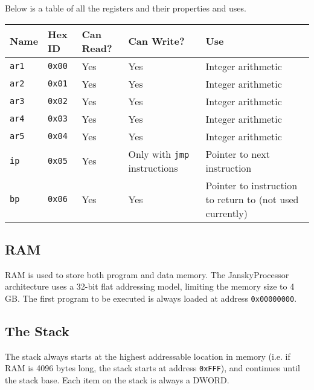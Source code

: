 \documentclass[12pt,letterpaper]{article}
\begin{document}
Below is a table of all the registers and their properties and uses.

\begin{center}
\begin{tabular}{ | l | l | l | l | p{3cm} |}
\hline
\textbf{Name} & \textbf{Hex ID} & \textbf{Can Read?} & \textbf{Can Write?} & \textbf{Use} \\ \hline
\texttt{ar1} & \texttt{0x00} & Yes & Yes & Integer arithmetic \\ \hline
\texttt{ar2} & \texttt{0x01} & Yes & Yes & Integer arithmetic \\ \hline
\texttt{ar3} & \texttt{0x02} & Yes & Yes & Integer arithmetic \\ \hline
\texttt{ar4} & \texttt{0x03} & Yes & Yes & Integer arithmetic \\ \hline
\texttt{ar5} & \texttt{0x04} & Yes & Yes & Integer arithmetic \\ \hline
\texttt{ip} & \texttt{0x05} & Yes & Only with \texttt{jmp} instructions & Pointer to next instruction \\ \hline
\texttt{bp} & \texttt{0x06} & Yes & Yes & Pointer to instruction to return to (not used currently) \\ \hline

\end{tabular}
\end{center}

\subsection{RAM}

RAM is used to store both program and data memory. The JanskyProcessor architecture uses a 32-bit flat addressing model, limiting the memory size to 4 GB.
\newline\newline
\noindent The first program to be executed is always loaded at address \texttt{0x00000000}.

\subsection{The Stack}

The stack always starts at the highest addressable location in memory (i.e. if RAM is 4096 bytes long, the stack starts at address \texttt{0xFFF}), and continues until the stack base. Each item on the stack is always a DWORD.
\end{document}
